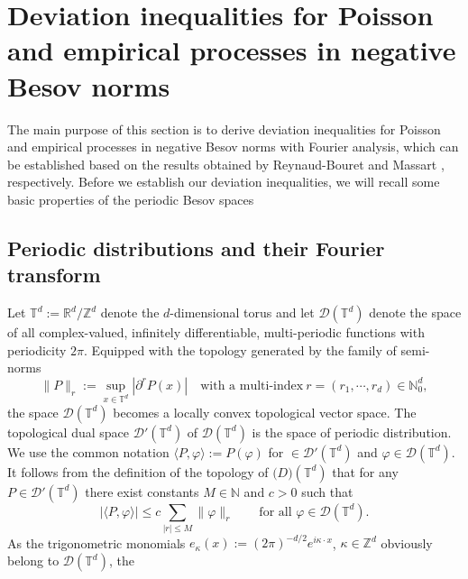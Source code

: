 \documentclass[10pt]{iopart}
\begin{document}
\section{Deviation inequalities for Poisson and empirical processes in negative Besov norms}
\label{sec:deviation_ieq}

\hspace{0.5cm}
The main purpose of this section is to derive deviation inequalities for Poisson and empirical processes in negative Besov norms 
with Fourier analysis, which can be established based on the results obtained by Reynaud-Bouret \cite{ReynaudBouret2003} and Massart 
\cite{Massart2000}, respectively. Before we establish our deviation inequalities, we will recall some basic properties of the periodic Besov spaces 


\subsection{Periodic distributions and their Fourier transform} 
Let $\mathbb{T}^{d}:=\mathbb{R}^{d}/\mathbb{Z}^{d}$ denote the $d$-dimensional torus 
and let $\mathscr{D}(\mathbb{T}^{d})$ denote the space of all complex-valued, infinitely differentiable, multi-periodic functions with 
periodicity $2\pi$. Equipped with the topology generated by the family of semi-norms 
\begin{equation*}
\|P\|_{r}:=\sup_{x\in\mathbb{T}^{d}}\left|\partial^{r}P(x)\right| \quad \mbox{with a multi-index}~ 
r=(r_{1}, \cdots, r_{d})\in\mathbb{N}_{0}^{d},
\end{equation*}
the space $\mathscr{D}(\mathbb{T}^{d})$ becomes a locally convex topological 
vector space. The topological dual space $\mathscr{D}'(\mathbb{T}^{d})$
of $\mathscr{D}(\mathbb{T}^{d})$ is the space of periodic distribution. 
We use the common notation $\langle P,\varphi\rangle:= P(\varphi)$ for 
$\in\mathscr{D}'(\mathbb{T}^{d})$ and $\varphi\in \mathscr{D}(\mathbb{T}^{d})$. 
It follows from the definition of the topology of $\mathscr(D)(\mathbb{T}^{d})$ 
that for any $P\in\mathscr{D}'(\mathbb{T}^{d})$ there exist constants 
$M\in\mathbb{N}$ and $c>0$ such that 
\begin{equation}\label{11}
|\langle P, \varphi\rangle|\leq c\sum_{|r|\leq M}\|\varphi\|_{r}
\qquad \mbox{for all }\varphi\in \mathscr{D}(\mathbb{T}^{d}).
\end{equation}
As the trigonometric monomials $e_{\kappa}(x):=(2\pi)^{-d/2}e^{i\kappa\cdot x}$, 
$\kappa\in\mathbb{Z}^{d}$ obviously belong to $\mathscr{D}(\mathbb{T}^{d})$, the 
\end{document}
